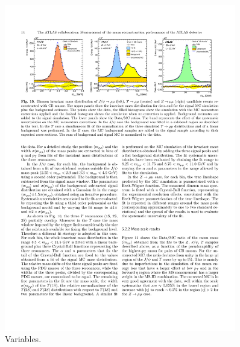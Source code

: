 \begin{figure}[tp]
  \centering
  \includegraphics[width=0.90\textwidth]{figures/performance/muon-energyscale}
  \caption{Variables.}
  \label{fig:strategy-objects-muon-energyscale}
\end{figure}

